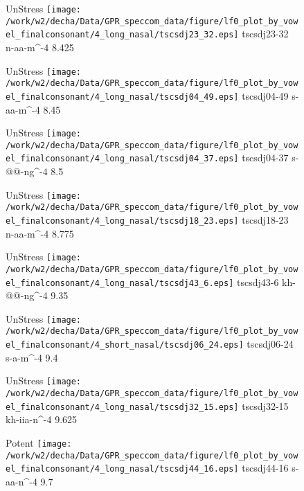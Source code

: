 \documentclass{article}
\begin{document}
\begin{figure}[t]
\begin{minipage}[b]{.24\textwidth}
UnStress
\centering
\texttt{[image: /work/w2/decha/Data/GPR\_speccom\_data/figure/lf0\_plot\_by\_vowel\_finalconsonant/4\_long\_nasal/tscsdj23\_32.eps]}
tscsdj23-32 n-aa-m\textasciicircum-4 8.425
\end{minipage}
\begin{minipage}[b]{.24\textwidth}
UnStress
\centering
\texttt{[image: /work/w2/decha/Data/GPR\_speccom\_data/figure/lf0\_plot\_by\_vowel\_finalconsonant/4\_long\_nasal/tscsdj04\_49.eps]}
tscsdj04-49 s-aa-m\textasciicircum-4 8.45
\end{minipage}
\begin{minipage}[b]{.24\textwidth}
UnStress
\centering
\texttt{[image: /work/w2/decha/Data/GPR\_speccom\_data/figure/lf0\_plot\_by\_vowel\_finalconsonant/4\_long\_nasal/tscsdj04\_37.eps]}
tscsdj04-37 s-@@-ng\textasciicircum-4 8.5
\end{minipage}
\begin{minipage}[b]{.24\textwidth}
UnStress
\centering
\texttt{[image: /work/w2/decha/Data/GPR\_speccom\_data/figure/lf0\_plot\_by\_vowel\_finalconsonant/4\_long\_nasal/tscsdj18\_23.eps]}
tscsdj18-23 n-aa-m\textasciicircum-4 8.775
\end{minipage}
\end{figure}

\begin{figure}[t]
\begin{minipage}[b]{.24\textwidth}
UnStress
\centering
\texttt{[image: /work/w2/decha/Data/GPR\_speccom\_data/figure/lf0\_plot\_by\_vowel\_finalconsonant/4\_long\_nasal/tscsdj43\_6.eps]}
tscsdj43-6 kh-@@-ng\textasciicircum-4 9.35
\end{minipage}
\begin{minipage}[b]{.24\textwidth}
UnStress
\centering
\texttt{[image: /work/w2/decha/Data/GPR\_speccom\_data/figure/lf0\_plot\_by\_vowel\_finalconsonant/4\_short\_nasal/tscsdj06\_24.eps]}
tscsdj06-24 s-a-m\textasciicircum-4 9.4
\end{minipage}
\begin{minipage}[b]{.24\textwidth}
UnStress
\centering
\texttt{[image: /work/w2/decha/Data/GPR\_speccom\_data/figure/lf0\_plot\_by\_vowel\_finalconsonant/4\_long\_nasal/tscsdj32\_15.eps]}
tscsdj32-15 kh-iia-n\textasciicircum-4 9.625
\end{minipage}
\begin{minipage}[b]{.24\textwidth}
\colorbox{Apricot}{Potent}
\centering
\texttt{[image: /work/w2/decha/Data/GPR\_speccom\_data/figure/lf0\_plot\_by\_vowel\_finalconsonant/4\_long\_nasal/tscsdj44\_16.eps]}
tscsdj44-16 s-aa-n\textasciicircum-4 9.7
\end{minipage}
\end{figure}
\end{document}
